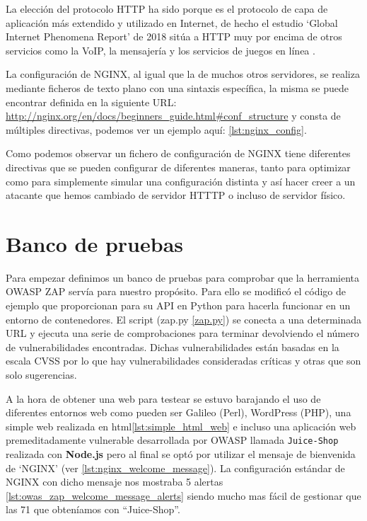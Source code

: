 \bigskip
La elección del protocolo HTTP ha sido porque es el protocolo de capa de aplicación más extendido y utilizado en Internet, de hecho el estudio `Global Internet Phenomena Report' de 2018 sitúa a HTTP muy por encima de otros servicios como la VoIP, la mensajería y los servicios de juegos en línea \cite{sandvine_2018_2018}.

\bigskip
La configuración de NGINX, al igual que la de muchos otros servidores, se realiza mediante ficheros de texto plano con una sintaxis específica, la misma se puede encontrar definida en la siguiente URL: \url{http://nginx.org/en/docs/beginners_guide.html#conf_structure} y consta de múltiples directivas, podemos ver un ejemplo aquí: \ref{lst:nginx_config}.

Como podemos observar un fichero de configuración de NGINX tiene diferentes directivas que se pueden configurar de diferentes maneras, tanto para optimizar como para simplemente simular una configuración distinta y así hacer creer a un atacante que hemos cambiado de servidor HTTTP o incluso de servidor físico.

\section{Banco de pruebas}

Para empezar definimos un banco de pruebas para comprobar que la herramienta OWASP ZAP servía para nuestro propósito. Para ello se modificó el código de ejemplo que proporcionan para su API en Python para hacerla funcionar en un entorno de contenedores. El script (zap.py \ref{zap.py}) se conecta a una determinada URL y ejecuta una serie de comprobaciones para terminar devolviendo el número de vulnerabilidades encontradas. Dichas vulnerabilidades están basadas en la escala CVSS por lo que hay vulnerabilidades consideradas críticas y otras que son solo sugerencias.

\bigskip
A la hora de obtener una web para testear se estuvo barajando el uso de diferentes entornos web como pueden ser Galileo (Perl), WordPress (PHP), una simple web realizada en html\ref{lst:simple_html_web} e incluso una aplicación web premeditadamente vulnerable desarrollada por OWASP llamada \texttt{Juice-Shop} realizada con \textbf{Node.js} pero al final se optó por utilizar el mensaje de bienvenida de `NGINX' (ver \ref{lst:nginx_welcome_message}). La configuración estándar de NGINX con dicho mensaje nos mostraba 5 alertas \ref{lst:owas_zap_welcome_message_alerts} siendo mucho mas fácil de gestionar que las 71 que obteníamos con ``Juice-Shop''.

